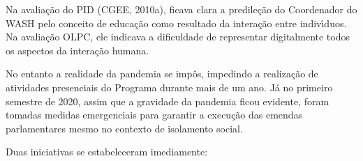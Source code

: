 \documentclass[
12pt,		%
openright,	%
twoside,  %
a4paper,			%
chapter=TITLE,		%
english,			%
french,				%
spanish,			%
brazil				%
]{USPSC-classe/USPSC}
\begin{document}
Na avalia\c{c}\~ao do PID  (CGEE, 2010a), ficava clara a predile\c{c}\~ao do Coordenador do WASH pelo conceito de educa\c{c}\~ao como resultado da intera\c{c}\~ao entre indiv\'{\i}duos. Na avalia\c{c}\~ao OLPC, ele indicava a dificuldade de representar digitalmente todos os aspectos da intera\c{c}\~ao humana.










No entanto a realidade da pandemia se imp\^os, impedindo a realiza\c{c}\~ao de atividades presenciais do Programa durante mais de um ano. J\'a no primeiro semestre de 2020, assim que a gravidade da pandemia ficou evidente, foram tomadas medidas emergenciais para garantir a execu\c{c}\~ao das emendas parlamentares mesmo no contexto de isolamento social.










Duas iniciativas se estabeleceram imediamente:
\end{document}
